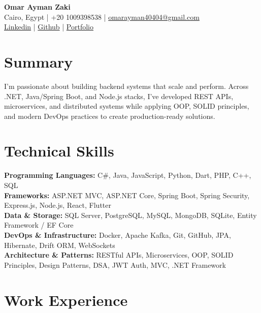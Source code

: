 \documentclass[10pt, letterpaper]{article}
\begin{document}
\begin{center}
  {\LARGE\bfseries Omar Ayman Zaki} \\[2pt]
  Cairo, Egypt \quad|\quad
  +20 1009398538 \quad|\quad
  \href{mailto:omarayman40404@gmail.com}{omarayman40404@gmail.com} \\[2pt]
  \href{https://linkedin.com/in/omar-ayman-723b401b4}{Linkedin}
  \quad|\quad
  \href{https://github.com/OmarAyman415}{Github}
  \quad|\quad
  \href{https://omarayman415.github.io/}{Portfolio}
\end{center}

\vspace{-4pt}

\section{Summary}

I'm passionate about building backend systems that scale and perform. Across .NET, Java/Spring Boot, and Node.js stacks, I've developed REST APIs, microservices, and distributed systems while applying OOP, SOLID principles, and modern DevOps practices to create production-ready solutions.

\section{Technical Skills}

\textbf{Programming Languages:} C\#, Java, JavaScript, Python, Dart, PHP, C++, SQL \\
\textbf{Frameworks:} ASP.NET MVC, ASP.NET Core, Spring Boot, Spring Security, Express.js, Node.js, React, Flutter \\
\textbf{Data \& Storage:} SQL Server, PostgreSQL, MySQL, MongoDB, SQLite, Entity Framework / EF Core \\
\textbf{DevOps \& Infrastructure:} Docker, Apache Kafka, Git, GitHub, JPA, Hibernate, Drift ORM, WebSockets \\
\textbf{Architecture \& Patterns:} RESTful APIs, Microservices, OOP, SOLID Principles, Design Patterns, DSA, JWT Auth, MVC, .NET Framework

\section{Work Experience}
\end{document}
